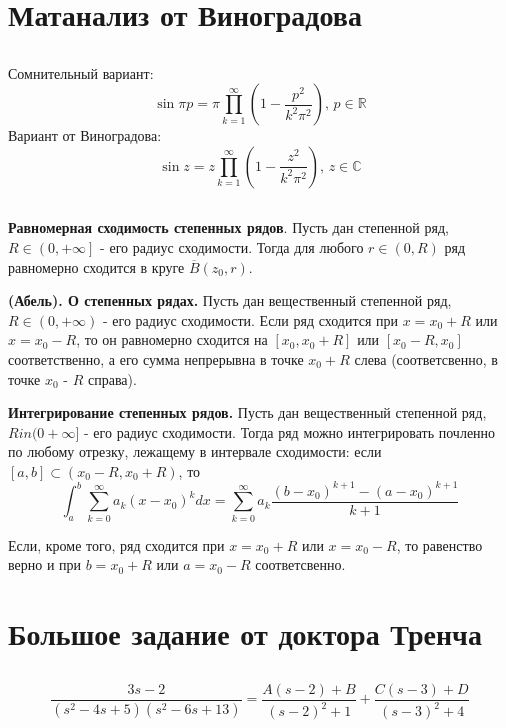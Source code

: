 \documentclass{article}
\begin{document}
\pagestyle{empty}
\normalsize

\section{Матанализ от Виноградова}
\subsection{}
Сомнительный вариант:
$$\sin{\pi p} = \pi \prod ^ {\infty} _ {k=1} \left ( 1 - \frac{p^2}{k^2\pi^{2}}\right), \, p \in \mathbb{R}$$
Вариант от Виноградова:
$$\sin{z} = z \prod ^ {\infty} _ {k=1} \left ( 1 - \frac{z^2}{k^2\pi^{2}}\right), \, z \in \mathbb{C}$$


\subsection{}
\textbf{Равномерная сходимость степенных рядов}. Пусть дан степенной ряд, $R \in \left( 0, +\infty \right]$ - его радиус сходимости. Тогда для любого $r \in \left(0, R \right)$ ряд равномерно сходится в круге $\overline{B} \left( z_0, r\right)$.
\newline


\noindent \textbf{(Абель). О степенных рядах.} Пусть дан вещественный степенной ряд, $R \in \left( 0, +\infty \right)$ - его радиус сходимости. Если ряд сходится при $x = x_0 + R$ или $x = x_0 - R$, то он равномерно сходится на $[ x_0, x_0 + R ]$ или $[ x_0 - R, x_0]$ соответственно, а его сумма непрерывна в точке $x_0 + R$ слева (соответсвенно, в точке $x_0$ - $R$ справа).
\newline


\noindent \textbf{Интегрирование степенных рядов.} Пусть дан вещественный степенной ряд, $R in (0 + \infty]$ - его радиус сходимости. Тогда ряд можно интегрировать почленно по любому отрезку, лежащему в интервале сходимости: если $[a,b] \subset (x_0 - R, x_0 + R)$, то $$\int^{b}_a \sum^{\infty}_{k = 0} a_k(x - x_0)^k dx = \sum^{\infty}_{k = 0}a_k\frac{(b - x_0)^{k + 1} - (a - x_0)^{k+1}}{k +1}$$


\noindent Если, кроме того, ряд сходится при $x = x_0 + R$ или $x = x_0 - R$, то равенство верно и при $b = x_0 + R$ или $a = x_0 - R$ соответсвенно.


\section{Большое задание от доктора Тренча}

\subsection{}
$$\frac{3 s - 2}{(s^2 -4s +5)(s^2 - 6s + 13)} = \frac{A(s-2) + B}{(s - 2)^2 + 1} +\frac{C(s -3) + D}{(s - 3)^2 + 4}$$
\end{document}
